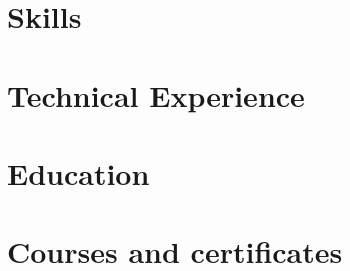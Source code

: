 \documentclass[letter,11pt]{article}
\begin{document}


\section{Skills}


\section{Technical Experience}


\section{Education}


\section{Courses and certificates}


 
\end{document}

